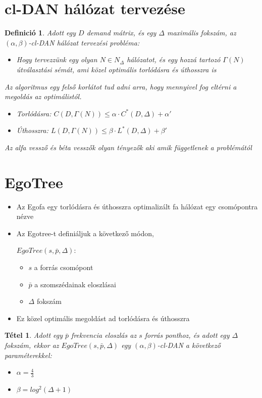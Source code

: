 \documentclass[12pt]{report}
\newtheorem{mydef}{Definició}
\newtheorem{mytetel}{Tétel}
\begin{document}
\section{cl-DAN hálózat tervezése}
	
\begin{mydef}
	Adott egy \(D\) demand mátrix, és egy \(\Delta\) maximális fokszám, az \((\alpha, \beta)\)-cl-DAN hálózat tervezési probléma:
	\begin{itemize}
		\item Hogy tervezzünk egy olyan \(N \in N_\Delta\) hálózatot, és egy hozzá tartozó \(\Gamma(N)\) útválasztási sémát, ami közel optimális torlódásra és úthosszra is
	\end{itemize}

	Az algoritmus egy felső korlátot tud adni arra, hogy mennyivel fog eltérni a megoldás az optimálistól.
	\begin{itemize}
		\item Torlódásra: \(C(D, \Gamma(N)) \le \alpha \cdot C^*(D, \Delta) + \alpha'\)
		\item Úthosszra: \(L(D, \Gamma(N)) \le \beta \cdot L^*(D, \Delta) + \beta'\)
	\end{itemize}
	Az alfa vessző és béta vesszők olyan tényezők aki amik függetlenek a problémától
\end{mydef}

\section{EgoTree}

\begin{itemize}
	\item Az Egofa egy torlódásra és úthosszra optimalizált fa hálózat egy csomópontra nézve
	\item Az Egotree-t definiáljuk a következő módon, 
	
	\(EgoTree(s, \bar{p}, \Delta) \):
	\begin{itemize}
		\item \(s\) a forrás csomópont
		\item \(\bar{p}\) a szomszédainak eloszlásai
		\item \(\Delta\) fokszám
	\end{itemize}
	\item Ez közel optimális megoldást ad torlódásra és úthosszra
\end{itemize}

\begin{mytetel}
	Adott egy  \(\bar{p}\) frekvencia eloszlás az \(s\) forrás ponthoz, és adott egy \(\Delta\) fokszám, ekkor az \(EgoTree(s, \bar{p}, \Delta)\) egy \((\alpha, \beta)\)-cl-DAN a következő paraméterekkel:
	\begin{itemize}
		\item \(\alpha = \frac{4}{3}\)
		\item \(\beta = log^2(\Delta + 1)\)
	\end{itemize}
\end{mytetel}
\end{document}
